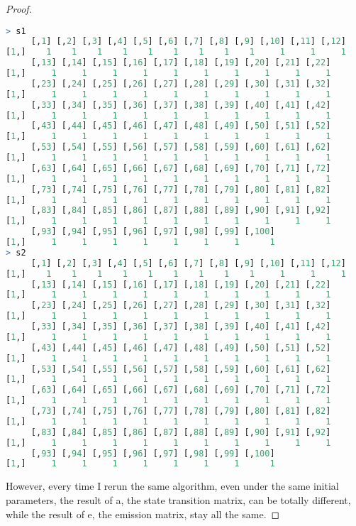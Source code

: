 \documentclass{article}
\begin{document}
\begin{proof}
\begin{lstlisting}[language = {R}]
> s1
     [,1] [,2] [,3] [,4] [,5] [,6] [,7] [,8] [,9] [,10] [,11] [,12]
[1,]    1    1    1    1    1    1    1    1    1     1     1     1
     [,13] [,14] [,15] [,16] [,17] [,18] [,19] [,20] [,21] [,22]
[1,]     1     1     1     1     1     1     1     1     1     1
     [,23] [,24] [,25] [,26] [,27] [,28] [,29] [,30] [,31] [,32]
[1,]     1     1     1     1     1     1     1     1     1     1
     [,33] [,34] [,35] [,36] [,37] [,38] [,39] [,40] [,41] [,42]
[1,]     1     1     1     1     1     1     1     1     1     1
     [,43] [,44] [,45] [,46] [,47] [,48] [,49] [,50] [,51] [,52]
[1,]     1     1     1     1     1     1     1     1     1     1
     [,53] [,54] [,55] [,56] [,57] [,58] [,59] [,60] [,61] [,62]
[1,]     1     1     1     1     1     1     1     1     1     1
     [,63] [,64] [,65] [,66] [,67] [,68] [,69] [,70] [,71] [,72]
[1,]     1     1     1     1     1     1     1     1     1     1
     [,73] [,74] [,75] [,76] [,77] [,78] [,79] [,80] [,81] [,82]
[1,]     1     1     1     1     1     1     1     1     1     1
     [,83] [,84] [,85] [,86] [,87] [,88] [,89] [,90] [,91] [,92]
[1,]     1     1     1     1     1     1     1     1     1     1
     [,93] [,94] [,95] [,96] [,97] [,98] [,99] [,100]
[1,]     1     1     1     1     1     1     1      1
> s2
     [,1] [,2] [,3] [,4] [,5] [,6] [,7] [,8] [,9] [,10] [,11] [,12]
[1,]    1    1    1    1    1    1    1    1    1     1     1     1
     [,13] [,14] [,15] [,16] [,17] [,18] [,19] [,20] [,21] [,22]
[1,]     1     1     1     1     1     1     1     1     1     1
     [,23] [,24] [,25] [,26] [,27] [,28] [,29] [,30] [,31] [,32]
[1,]     1     1     1     1     1     1     1     1     1     1
     [,33] [,34] [,35] [,36] [,37] [,38] [,39] [,40] [,41] [,42]
[1,]     1     1     1     1     1     1     1     1     1     1
     [,43] [,44] [,45] [,46] [,47] [,48] [,49] [,50] [,51] [,52]
[1,]     1     1     1     1     1     1     1     1     1     1
     [,53] [,54] [,55] [,56] [,57] [,58] [,59] [,60] [,61] [,62]
[1,]     1     1     1     1     1     1     1     1     1     1
     [,63] [,64] [,65] [,66] [,67] [,68] [,69] [,70] [,71] [,72]
[1,]     1     1     1     1     1     1     1     1     1     1
     [,73] [,74] [,75] [,76] [,77] [,78] [,79] [,80] [,81] [,82]
[1,]     1     1     1     1     1     1     1     1     1     1
     [,83] [,84] [,85] [,86] [,87] [,88] [,89] [,90] [,91] [,92]
[1,]     1     1     1     1     1     1     1     1     1     1
     [,93] [,94] [,95] [,96] [,97] [,98] [,99] [,100]
[1,]     1     1     1     1     1     1     1      1
\end{lstlisting}

However, every time I rerun the same algorithm, even under the same initial parameters,
the result of a, the state transition matrix, can be totally different, while the result of e,
 the emission matrix, stay all the same. 
\end{proof}
\end{document}
